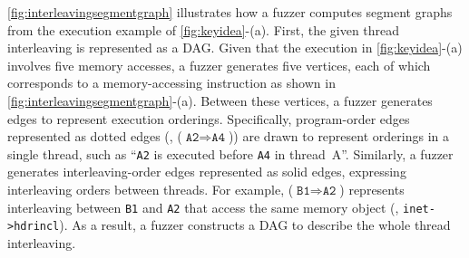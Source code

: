 %



%
%
\autoref{fig:interleavingsegmentgraph} illustrates how a fuzzer 
computes segment graphs from the execution example of
\autoref{fig:keyidea}-(a).
%
First, the given thread interleaving is represented as a DAG.
Given that the execution in \autoref{fig:keyidea}-(a) involves 
five memory accesses, a fuzzer generates five vertices, 
each of which corresponds to a memory-accessing instruction 
as shown in \autoref{fig:interleavingsegmentgraph}-(a).
%
Between these vertices, a fuzzer generates edges to represent
execution orderings. Specifically, program-order edges represented as
dotted edges (\eg, ($\texttt{A2} \Rightarrow \texttt{A4}$)) are drawn
to represent orderings in a single thread, such as
``\texttt{A2} is executed before \texttt{A4} in thread~A''.
%
Similarly, a fuzzer generates interleaving-order edges represented as
solid edges, expressing interleaving orders between threads. For
example, ($\texttt{B1} \Rightarrow \texttt{A2}$) represents
interleaving between \texttt{B1} and \texttt{A2} that access the same
memory object (\ie, \texttt{inet->hdrincl}).
%
As a result, a fuzzer constructs a DAG to describe the whole
thread interleaving.

